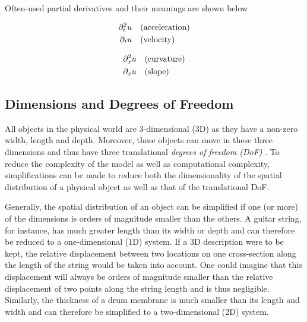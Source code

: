 Often-used partial derivatives and their meanings  are shown below

\begin{minipage}[c]{0.49\textwidth}
    \begin{align*}
        \partial_t^2 u &\quad \text{(acceleration)}\\
        \partial_t u &\quad \text{(velocity)}
    \end{align*}
\end{minipage}
\begin{minipage}[c]{0.49\textwidth}
    \begin{align*}
    \partial_x^2 u &\quad \text{(curvature)}\\
    \partial_x u &\quad \text{(slope)}
    \end{align*}
\end{minipage}

\subsection{Dimensions and Degrees of Freedom}\label{sec:dimensions}
All objects in the physical world are 3-dimensional (3D) as they have a non-zero width, length and depth. Moreover, these objects can move in these three dimensions and thus have three translational \textit{degrees of freedom (DoF)} . 
To reduce the complexity of the model as well as computational complexity, simplifications can be made to reduce both the dimensionality of the spatial distribution of a physical object as well as that of the translational DoF. 

Generally, the spatial distribution of an object can be simplified if one (or more) of the dimensions is orders of magnitude smaller than the others. A guitar string, for instance, has much greater length than its width or depth and can therefore be reduced to a one-dimensional (1D) system. If a 3D description were to be kept, the relative displacement between two locations on one cross-section along the length of the string would be taken into account. One could imagine that this displacement will always be orders of magnitude smaller than the relative displacement of two points along the string length and is thus negligible. Similarly, the thickness of a drum membrane is much smaller than its length and width and can therefore be simplified to a two-dimensional (2D) system. 

